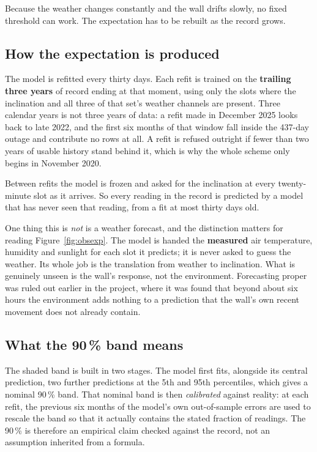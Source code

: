 \documentclass[11pt,a4paper]{article}
\begin{document}
Because the weather changes constantly and the wall drifts slowly, no fixed
threshold can work. The expectation has to be rebuilt as the record grows.

\subsection*{How the expectation is produced}

The model is refitted every thirty days. Each refit is trained on the
\textbf{trailing three years} of record ending at that moment, using only the
slots where the inclination and all three of that set's weather channels are
present. Three calendar years is not three years of data: a refit made in
December 2025 looks back to late 2022, and the first six months of that window
fall inside the 437-day outage and contribute no rows at all. A refit is refused
outright if fewer than two years of usable history stand behind it, which is why
the whole scheme only begins in November 2020.

Between refits the model is frozen and asked for the inclination at every
twenty-minute slot as it arrives. So every reading in the record is predicted by
a model that has never seen that reading, from a fit at most thirty days old.

One thing this is \emph{not} is a weather forecast, and the distinction matters
for reading Figure~\ref{fig:obsexp}. The model is handed the \textbf{measured}
air temperature, humidity and sunlight for each slot it predicts; it is never
asked to guess the weather. Its whole job is the translation from weather to
inclination. What is genuinely unseen is the wall's response, not the
environment. Forecasting proper was ruled out earlier in the project, where it
was found that beyond about six hours the environment adds nothing to a
prediction that the wall's own recent movement does not already contain.

\subsection*{What the 90\,\% band means}

The shaded band is built in two stages. The model first fits, alongside its
central prediction, two further predictions at the 5th and 95th percentiles,
which gives a nominal 90\,\% band. That nominal band is then \emph{calibrated}
against reality: at each refit, the previous six months of the model's own
out-of-sample errors are used to rescale the band so that it actually contains
the stated fraction of readings. The 90\,\% is therefore an empirical claim
checked against the record, not an assumption inherited from a formula.
\end{document}
